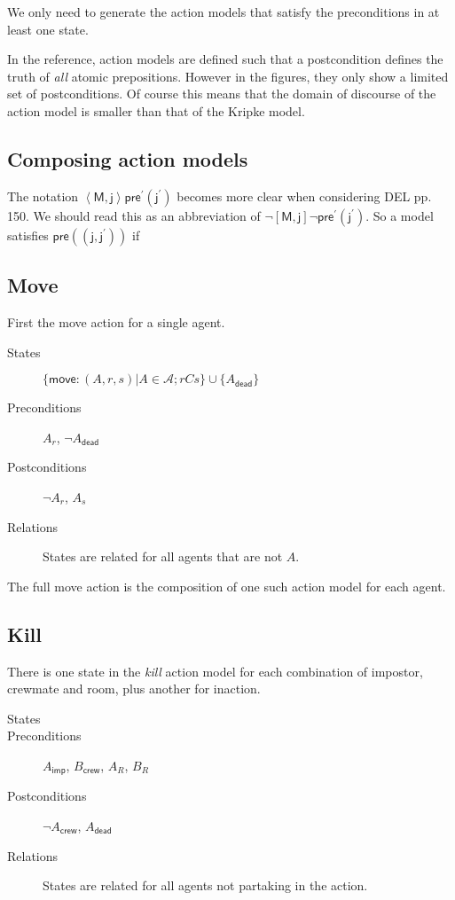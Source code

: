 \documentclass[a4paper]{scrartcl}
\begin{document}
We only need to generate the action models that satisfy the preconditions in at least one state.

In the reference, action models are defined such that a postcondition defines the truth of \emph{all} atomic prepositions. However in the figures, they only show a limited set of postconditions. Of course this means that the domain of discourse of the action model is smaller than that of the Kripke model. 

\subsection*{Composing action models}
The notation $\left<\mathsf{M,j} \right> \mathsf{pre^\prime(j^\prime)}$ becomes more clear when considering DEL pp. 150. We should read this as an abbreviation of $\neg \left[\mathsf{M,j} \right] \neg \mathsf{pre^\prime(j^\prime)}$. So a model satisfies $\mathsf{pre((j,j^\prime))}$ if 

\subsection*{Move}
First the move action for a single agent.
\begin{description}
\item[States] $\{\mathsf{move}:(A, r, s) | A \in \mathcal{A}; rCs\} \cup \{A_\mathsf{dead}\}$ 
\item[Preconditions] $A_r$, $\neg A_\mathsf{dead}$
\item[Postconditions] $\neg A_r$, $A_s$
  
\item[Relations] States are related for all agents that are not $A$. 
\end{description}

The full move action is the composition of one such action model for each agent. 
\subsection*{Kill}
There is one state in the \emph{kill} action model for each combination of impostor, crewmate and room, plus another for inaction. 
\begin{description}
\item[States] 
\item[Preconditions] $A_\mathsf{imp}$, $B_\mathsf{crew}$, $A_R$, $B_R$
\item[Postconditions] $\neg A_\mathsf{crew}$, $A_\mathsf{dead}$
  
\item[Relations] States are related for all agents not partaking in the action.
\end{description}
\end{document}
